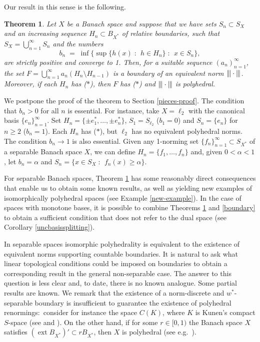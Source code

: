 \documentclass[12pt,a4paper]{amsart}
\newtheorem{theorem}{Theorem}
\theoremstyle{definition}
\theoremstyle{remark}
\DeclareMathOperator{\ext}{ext}
\newcommand{\set}[2]{\{{#1} \;:\;\, {#2}\}}
\newcommand{\st}{($*$)}
\newcommand{\tri}{{\displaystyle |\kern-.9pt|\kern-.9pt|}}
\newcommand{\tndot}{\ensuremath{\tri\cdot\tri}}
\begin{document}
Our result in this sense is the following.

\begin{theorem}\label{renorm-pieces}
Let $X$ be a Banach space and suppose that we have sets $S_n \subset S_X$
and an increasing sequence $H_n \subset B_{X^*}$ of relative boundaries,
such that $S_X = \bigcup_{n=1}^\infty S_n$ and the numbers
\[
b_n \;=\; \inf\set{\sup\set{h(x)}{h \in  H_n}}{x \in S_n},
\]
are strictly positive and converge to 1. Then, for a suitable sequence
$(a_n)_{n=1}^\infty$, the set $F = \bigcup_{n=1}^\infty a_n(H_n\setminus H_{n-1})$
is a boundary of an equivalent norm $\tndot$. Moreover, if each $H_n$
has {\st}, then $F$ has {\st} and $\tndot$ is polyhedral.
\end{theorem}

We postpone the proof of the theorem to Section \ref{pieces-proof}.
The condition that $b_n > 0$ for all $n$ is essential. For instance, take
$X=\ell_2$ with the canonical basis $\{e_n\}_{n=1}^\infty$. Set $H_n = \{\pm
e_1^*,\dots, \pm e_n^* \}$, $S_1=S_{\ell_2}$ ($b_1=0$) and $S_n =
\{e_n\}$ for $n\geq 2$ ($b_n = 1$). Each $H_n$ has {\st},
but $\ell_2$ has no equivalent polyhedral norms. The condition $b_n
\to 1$ is also essential. Given any 1-norming set $\{f_n\}_{n=1}^\infty \subset
S_{X^*}$ of a separable Banach space $X$, we can define
$H_n=\{f_1,\dots,f_n\}$ and, given $0 < \alpha <1$, let $b_n = \alpha$
and $S_n = \set{x\in S_X}{f_n(x)\geq\alpha}$.

For separable Banach spaces, Theorem \ref{renorm-pieces} has
some reasonably direct consequences that enable us to obtain some known
results, as well as yielding new examples of isomorphically polyhedral
spaces (see Example \ref{new-example}). In the case of spaces with monotone
bases, it is possible to combine Theorems \ref{renorm-pieces} and
\ref{boundary} to obtain a sufficient condition that does not refer to
the dual space (see Corollary \ref{uncbasissplitting}).

In separable spaces isomorphic polyhedrality is equivalent to the
existence of equivalent norms supporting countable boundaries.
It is natural to ask what linear topological conditions could be imposed
on boundaries to obtain a corresponding result in the general non-separable case.
The answer to this question is less clear and, to date, there is no known analogue.
Some partial results are known. We remark that the existence of a
norm-discrete and $w^*$-separable boundary is insufficient
to guarantee the existence of polyhedral renormings:\ consider for
instance the space $C(K)$, where $K$ is Kunen's compact $S$-space
(see \cite{JM} and \cite[p.\ 450]{FPST}). On the other hand, if for some
$r \in [0,1)$ the Banach space $X$ satisfies $\left(\ext{B_{X^*}}\right)'
\subset rB_{X^*}$, then $X$ is polyhedral (see e.g.\ \cite{FV}).
\end{document}
